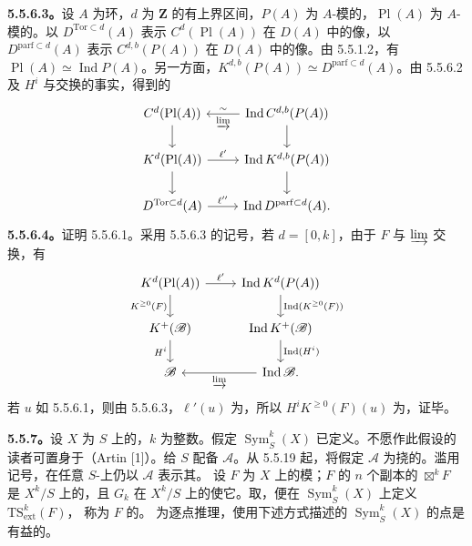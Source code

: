 \textbf{5.5.6.3。}设 $A$ 为环，$d$ 为 $\mathbf Z$ 的有上界区间，$P(A)$ 为 $A$-模的，$\operatorname{Pl}(A)$ 为 $A$-模的。以 $D^{\mathrm{Tor}\subset d}(A)$ 表示 $C^d(\operatorname{Pl}(A))$ 在 $D(A)$ 中的像，以 $D^{\mathrm{parf}\subset d}(A)$ 表示 $C^{d,b}(P(A))$ 在 $D(A)$ 中的像。由 5.5.1.2，有 $\operatorname{Pl}(A)\simeq\operatorname{Ind}P(A)$。另一方面，$K^{d,b}(P(A))\simeq D^{\mathrm{parf}\subset d}(A)$。由 5.5.6.2 及 $H^i$ 与交换的事实，得到的
\[\begin{tikzcd}
C^d(\operatorname{Pl}(A))\arrow[d]&\operatorname{Ind}C^{d,b}(P(A))\arrow[l,"{\varinjlim}","\sim"']\arrow[d]\\
K^d(\operatorname{Pl}(A))\arrow[r,"\ell'"]\arrow[d]&\operatorname{Ind}K^{d,b}(P(A))\arrow[d]\\
D^{\mathrm{Tor}\subset d}(A)\arrow[r,"\ell''"]&\operatorname{Ind}D^{\mathrm{parf}\subset d}(A).
\end{tikzcd}\]
\textbf{5.5.6.4。}证明 5.5.6.1。采用 5.5.6.3 的记号，若 $d=[0,k]$，由于 $F$ 与 $\varinjlim$ 交换，有
\[\begin{tikzcd}
K^d(\operatorname{Pl}(A))\arrow[r,"\ell'"]\arrow[d,"K^{\geq0}(F)"']&\operatorname{Ind}K^d(P(A))\arrow[d,"\operatorname{Ind}(K^{\geq0}(F))"]\\
K^+(\mathscr B)\arrow[d,"H^i"']&\operatorname{Ind}K^+(\mathscr B)\arrow[d,"\operatorname{Ind}(H^i)"]\\
\mathscr B&\operatorname{Ind}\mathscr B\arrow[l,"{\varinjlim}"] .
\end{tikzcd}\]
若 $u$ 如 5.5.6.1，则由 5.5.6.3，$\ell'(u)$ 为，所以 $H^iK^{\geq0}(F)(u)$ 为，证毕。

\textbf{5.5.7。}设 $X$ 为 $S$ 上的，$k$ 为整数。假定 $\operatorname{Sym}^k_S(X)$ 已定义。不愿作此假设的读者可置身于（Artin [1]）。给 $S$ 配备 $\mathscr A$。从 5.5.19 起，将假定 $\mathscr A$ 为挠的。滥用记号，在任意 $S$-上仍以 $\mathscr A$ 表示其。
设 $F$ 为 $X$ 上的模；$F$ 的 $n$ 个副本的 $\boxtimes^kF$ 是 $X^k/S$ 上的，且 $G_k$ 在 $X^k/S$ 上的使它。取，便在 $\operatorname{Sym}^k_S(X)$ 上定义 $\mathrm{TS}^k_{\mathrm{ext}}(F)$，
称为 $F$ 的。
为逐点推理，使用下述方式描述的 $\operatorname{Sym}^k_S(X)$ 的点是有益的。

